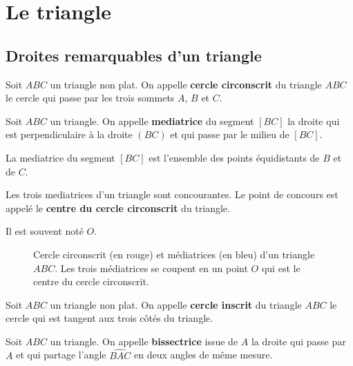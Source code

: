 \documentclass[a4paper,12pt]{article}
\begin{document}
\clearpage

\section{Le triangle}

\subsection{Droites remarquables d'un triangle}

\begin{definition}
    Soit $ABC$ un triangle non plat. On appelle \textbf{cercle circonscrit} du triangle $ABC$ le cercle qui passe par les trois sommets $A$, $B$ et $C$.
\end{definition}

\begin{definition}
    Soit $ABC$ un triangle. On appelle \textbf{mediatrice} du segment $[BC]$ la droite qui est perpendiculaire à la droite $(BC)$ et qui passe par le milieu de $[BC]$.
\end{definition}

\begin{proposition}{}{}
    La mediatrice du segment $[BC]$ est l'ensemble des points équidistants de $B$ et de $C$.
\end{proposition}

\begin{theoreme}{}{}
    Les trois mediatrices d'un triangle sont concourantes. Le point de concours est appelé le \textbf{centre du cercle circonscrit} du triangle.
    
    Il est souvent noté $O$.
\end{theoreme}

\tikzexternalenable
\begin{figure}[H]
    \centering
    \resizebox{0.44\textwidth}{!}{%
    
    }
    \caption{Cercle circonscrit (en rouge) et médiatrices (en bleu) d'un triangle $ABC$. Les trois médiatrices se coupent en un point $O$ qui est le centre du cercle circonscrit.}
\end{figure}
\tikzexternaldisable

\begin{definition}
    Soit $ABC$ un triangle non plat. On appelle \textbf{cercle inscrit} du triangle $ABC$ le cercle qui est tangent aux trois côtés du triangle.
\end{definition}

\begin{definition}
    Soit $ABC$ un triangle. On appelle \textbf{bissectrice} issue de $A$ la droite qui passe par $A$ et qui partage l'angle $\widehat{BAC}$ en deux angles de même mesure.
\end{definition}
\end{document}
